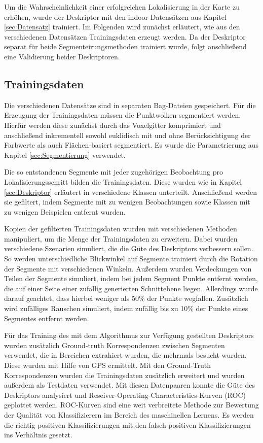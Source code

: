 Um die Wahrscheinlichkeit einer erfolgreichen Lokalisierung in der Karte zu erhöhen, wurde der Deskriptor mit den indoor-Datensätzen aus Kapitel \ref{sec:Datensatz} trainiert. Im Folgenden wird zunächst erläutert, wie aus den verschiedenen Datensätzen Trainingsdaten erzeugt werden. Da der Deskriptor separat für beide Segmenteirungsmethoden trainiert wurde, folgt anschließend eine Validierung beider Deskriptoren. 

\subsection{Trainingsdaten}

Die verschiedenen Datensätze sind in separaten Bag-Dateien gespeichert. Für die Erzeugung der Trainingsdaten müssen die Punktwolken segmentiert werden. Hierfür werden diese zunächst durch das Voxelgitter komprimiert und anschließend inkrementell sowohl euklidisch mit und ohne Berücksichtigung der Farbwerte als auch Flächen-basiert segmentiert. Es wurde die Parametrierung aus Kapitel \ref{sec:Segmentierung} verwendet.  

Die so entstandenen Segmente mit jeder zugehörigen Beobachtung pro \linebreak Lokalisierungsschritt bilden die Trainingsdaten. Diese wurden wie in Kapitel \ref{sec:Deskriptor} erläutert in verschiedene Klassen unterteilt. Anschließend werden sie gefiltert, indem Segmente mit zu wenigen Beobachtungen sowie Klassen mit zu wenigen Beispielen entfernt wurden. 

Kopien der gefilterten Trainingsdaten wurden mit verschiedenen Methoden manipuliert, um die Menge der Trainingsdaten zu erweitern. Dabei wurden verschiedene Szenarien simuliert, die die Güte  des Deskriptors verbessern sollen. So werden unterschiedliche Blickwinkel auf Segmente trainiert durch die Rotation der Segmente mit verschiedenen Winkeln. Außerdem wurden Verdeckungen von Teilen der Segmente simuliert, indem bei jedem Segment Punkte entfernt werden, die auf einer Seite einer zufällig generierten Schnittebene liegen. Allerdings wurde darauf geachtet, dass hierbei weniger als 50\% der Punkte wegfallen. Zusätzlich wird zufälliges Rauschen simuliert, indem zufällig bis zu 10\% der Punkte eines Segmentes entfernt werden.

Für das Training des mit dem Algorithmus zur Verfügung gestellten Deskriptors wurden zusätzlich Ground-truth Korrespondenzen zwischen Segmenten verwendet, die in Bereichen extrahiert wurden, die mehrmals besucht wurden. Diese wurden mit Hilfe von GPS ermittelt. Mit den Ground-Truth Korrespondenzen wurden die Trainingsdaten zusätzlich erweitert und wurden außerdem als Testdaten verwendet. Mit diesen Datenpaaren konnte die Güte des Deskriptors analysiert und Reseiver-Operating-\linebreak Characteristics-Kurven (ROC) geplottet werden. ROC-Kurven sind eine weit verbreitete Methode zur Bewertung der Qualität von Klassifizierern im Bereich des maschinellen Lernens. Es werden die richtig positiven Klassifizierungen mit den falsch positiven Klassifizierungen ins Verhältnis gesetzt. 

